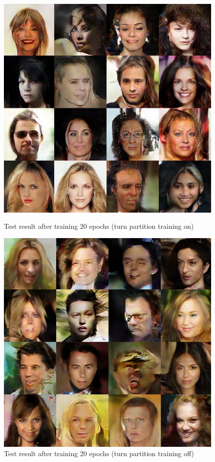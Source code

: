    \begin{figure}
        \begin{minipage}[t]{0.48\linewidth}
            \centering
            \includegraphics[width=\textwidth]{figures/result_part_on.png}
            \caption{Test result after training 20 epochs (turn partition training on)}
            \label{part_on}
        \end{minipage}
            \hfill
        \begin{minipage}[t]{0.48\linewidth}
            \centering
            \includegraphics[width=\textwidth]{figures/result_part_off.png}
            \caption{Test result after training 20 epochs (turn partition training off)}
            \label{part_off}
        \end{minipage}
    \end{figure}

